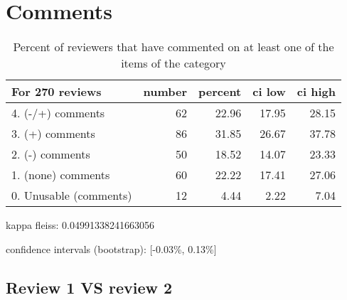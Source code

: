 \documentclass{article}
\begin{document}
\section{Comments} 

\begin{table}[H]

\centering

\begin{tabular}{lrrrr}
\hline
 For 270 reviews        &   number &   percent &   ci low &   ci high \\
\hline
 4. (-/+) comments      &       62 &     22.96 &    17.95 &     28.15 \\
 3. (+) comments        &       86 &     31.85 &    26.67 &     37.78 \\
 2. (-) comments        &       50 &     18.52 &    14.07 &     23.33 \\
 1. (none) comments     &       60 &     22.22 &    17.41 &     27.06 \\
 0. Unusable (comments) &       12 &      4.44 &     2.22 &      7.04 \\
\hline
\end{tabular}\caption{Percent of reviewers that have commented on at least one of the items of the category}

\end{table}



kappa fleiss: 0.04991338241663056

confidence intervals (bootstrap): [-0.03\%, 0.13\%]

\subsection{Review 1 VS review 2} 
\end{document}
